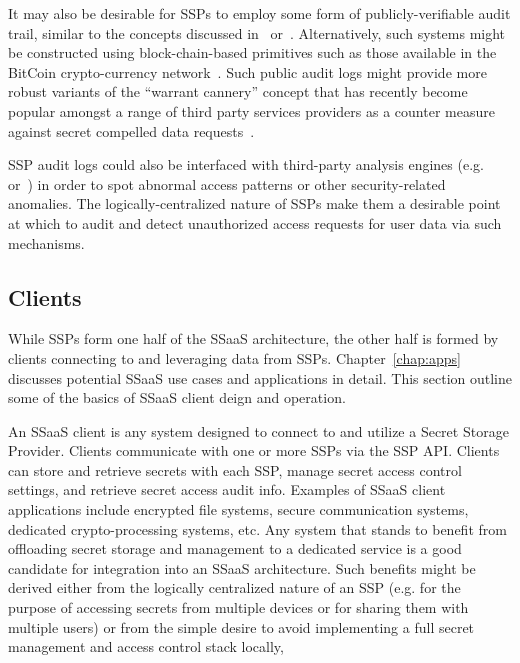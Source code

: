 It may also be desirable for SSPs to employ some form of
publicly-verifiable audit trail, similar to the concepts discussed
in~\cite{blaze1996} or~\cite{laurie2013}. Alternatively, such systems
might be constructed using block-chain-based primitives such as those
available in the BitCoin crypto-currency
network~\cite{Nakamoto2008}. Such public audit logs might provide more
robust variants of the ``warrant cannery'' concept that has recently
become popular amongst a range of third party services providers as a
counter measure against secret compelled data
requests~\cite{eff-canary}.

SSP audit logs could also be interfaced with third-party analysis
engines (e.g.~\cite{logrythm} or~\cite{splunk}) in order to spot
abnormal access patterns or other security-related anomalies. The
logically-centralized nature of SSPs make them a desirable point at
which to audit and detect unauthorized access requests for user data
via such mechanisms.

\subsection{Clients}

While SSPs form one half of the SSaaS architecture, the other half is
formed by clients connecting to and leveraging data from
SSPs. Chapter~\ref{chap:apps} discusses potential SSaaS use cases and
applications in detail. This section outline some of the basics of
SSaaS client deign and operation.

An SSaaS client is any system designed to connect to and utilize a
Secret Storage Provider. Clients communicate with one or more SSPs via
the SSP API. Clients can store and retrieve secrets with each SSP,
manage secret access control settings, and retrieve secret access
audit info. Examples of SSaaS client applications include encrypted
file systems, secure communication systems, dedicated
crypto-processing systems, etc. Any system that stands to benefit from
offloading secret storage and management to a dedicated service is a
good candidate for integration into an SSaaS architecture. Such
benefits might be derived either from the logically centralized nature
of an SSP (e.g. for the purpose of accessing secrets from multiple
devices or for sharing them with multiple users) or from the simple
desire to avoid implementing a full secret management and access
control stack locally,

